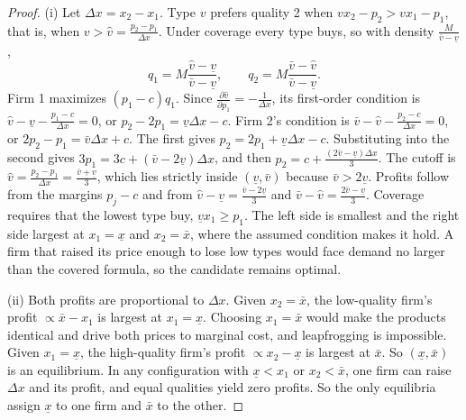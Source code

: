 \begin{proof}
(i) Let $\Delta x = x_2 - x_1$. Type $v$ prefers quality 2 when $vx_2 - p_2 > vx_1 - p_1$, that is, when
$v > \hat v = \frac{p_2 - p_1}{\Delta x}$. Under coverage every type buys, so with density $\frac{M}{\bar v - \underline v}$,
\begin{equation*}
q_1 = M\frac{\hat v - \underline v}{\bar v - \underline v}, \qquad q_2 = M\frac{\bar v - \hat v}{\bar v - \underline v}.
\end{equation*}
Firm 1 maximizes $(p_1 - c)q_1$. Since $\frac{\partial\hat v}{\partial p_1} = -\frac{1}{\Delta x}$, its first-order
condition is $\hat v - \underline v - \frac{p_1 - c}{\Delta x} = 0$, or $p_2 - 2p_1 = \underline v\Delta x - c$. Firm 2's
condition is $\bar v - \hat v - \frac{p_2 - c}{\Delta x} = 0$, or $2p_2 - p_1 = \bar v\Delta x + c$. The first gives
$p_2 = 2p_1 + \underline v\Delta x - c$. Substituting into the second gives $3p_1 = 3c + (\bar v - 2\underline v)\Delta x$,
and then $p_2 = c + \frac{(2\bar v - \underline v)\Delta x}{3}$. The cutoff is
$\hat v = \frac{p_2 - p_1}{\Delta x} = \frac{\bar v + \underline v}{3}$, which lies strictly inside $(\underline v, \bar v)$
because $\bar v > 2\underline v$. Profits follow from the margins $p_j - c$ and from
$\hat v - \underline v = \frac{\bar v - 2\underline v}{3}$ and $\bar v - \hat v = \frac{2\bar v - \underline v}{3}$. Coverage
requires that the lowest type buy, $\underline vx_1 \ge p_1$. The left side is smallest and the right side largest at
$x_1 = \underline x$ and $x_2 = \bar x$, where the assumed condition makes it hold. A firm that raised its price
enough to lose low types would face demand no larger than the covered formula, so the candidate remains optimal.

(ii) Both profits are proportional to $\Delta x$. Given $x_2 = \bar x$, the low-quality firm's profit
$\propto \bar x - x_1$ is largest at $x_1 = \underline x$. Choosing $x_1 = \bar x$ would make the products identical and
drive both prices to marginal cost, and leapfrogging is impossible. Given $x_1 = \underline x$, the high-quality firm's
profit $\propto x_2 - \underline x$ is largest at $\bar x$. So $(\underline x, \bar x)$ is an equilibrium. In any
configuration with $\underline x < x_1$ or $x_2 < \bar x$, one firm can raise $\Delta x$ and its profit, and equal
qualities yield zero profits. So the only equilibria assign $\underline x$ to one firm and $\bar x$ to the other.
\end{proof}

